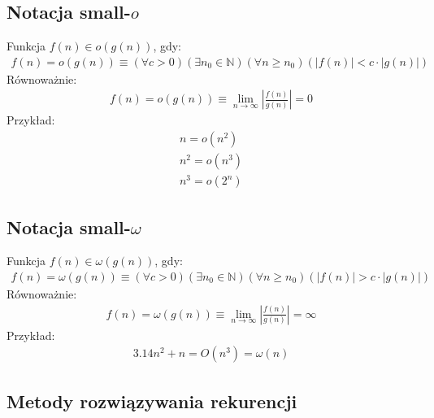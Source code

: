 \documentclass{article}
\numberwithin{equation}{subsection}
\newenvironment{definition}[1]{%
    \trivlist
    \item[\hskip\labelsep\textbf{Definition. #1.}]
    \ignorespaces
}{%
    \endtrivlist
}
\begin{document}
\subsection{Notacja small-$o$}

\begin{definition}{Notacja small-$o$}
    Funkcja $f(n)\in o(g(n))$, gdy:
    \begin{align}
        f(n) = o(g(n)) \equiv 
        \left(\forall c>0\right)
        \left(\exists n_0\in\mathbb{N}\right)
        \left(\forall n\geq n_0\right)
        \left(|f(n)| < c \cdot |g(n)|\right)
    \end{align}
    \noindent
    Równoważnie:
    \begin{align}
        f(n) = o(g(n)) \equiv \lim_{n\rightarrow \infty} \left|\frac{f(n)}{g(n)}\right| = 0
    \end{align}
    \noindent
    Przykład:
    \begin{align}
        n = o(n^2)\\
        n^2 = o(n^3)\\
        n^3 = o(2^n)
    \end{align}
\end{definition}

\subsection{Notacja small-$\omega$}

\begin{definition}{Notacja small-$\omega$}
    Funkcja $f(n)\in \omega(g(n))$, gdy:
    \begin{align}
        f(n) = \omega(g(n)) \equiv 
        \left(\forall c>0\right)
        \left(\exists n_0\in\mathbb{N}\right)
        \left(\forall n\geq n_0\right)
        \left(|f(n)| > c \cdot |g(n)|\right)
    \end{align}
    \noindent
    Równoważnie:
    \begin{align}
        f(n) = \omega(g(n)) \equiv \lim_{n\rightarrow \infty} \left|\frac{f(n)}{g(n)}\right| = \infty
    \end{align}
    \noindent
    Przykład:
    \begin{align}
        3.14n^2 + n = O(n^3) = \omega(n)
    \end{align}
\end{definition}

\subsection{Metody rozwiązywania rekurencji}
\end{document}
